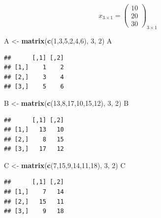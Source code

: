 \documentclass[
]{book}
\newenvironment{Shaded}{\begin{snugshade}}{\end{snugshade}}
\newcommand{\DecValTok}[1]{\textcolor[rgb]{0.00,0.00,0.81}{#1}}
\newcommand{\FunctionTok}[1]{\textcolor[rgb]{0.13,0.29,0.53}{\textbf{#1}}}
\newcommand{\NormalTok}[1]{#1}
\newcommand{\OtherTok}[1]{\textcolor[rgb]{0.56,0.35,0.01}{#1}}
\begin{document}
\[x_{3×1} =
\begin{pmatrix}
 10 \\
 20 \\
 30
\end{pmatrix}_{3×1}\]

\begin{Shaded}
\begin{Highlighting}[]
\NormalTok{ A }\OtherTok{\textless{}{-}} \FunctionTok{matrix}\NormalTok{(}\FunctionTok{c}\NormalTok{(}\DecValTok{1}\NormalTok{,}\DecValTok{3}\NormalTok{,}\DecValTok{5}\NormalTok{,}\DecValTok{2}\NormalTok{,}\DecValTok{4}\NormalTok{,}\DecValTok{6}\NormalTok{), }\DecValTok{3}\NormalTok{, }\DecValTok{2}\NormalTok{) }
\NormalTok{ A }
\end{Highlighting}
\end{Shaded}

\begin{verbatim}
##      [,1] [,2]
## [1,]    1    2
## [2,]    3    4
## [3,]    5    6
\end{verbatim}

\begin{Shaded}
\begin{Highlighting}[]
\NormalTok{ B }\OtherTok{\textless{}{-}} \FunctionTok{matrix}\NormalTok{(}\FunctionTok{c}\NormalTok{(}\DecValTok{13}\NormalTok{,}\DecValTok{8}\NormalTok{,}\DecValTok{17}\NormalTok{,}\DecValTok{10}\NormalTok{,}\DecValTok{15}\NormalTok{,}\DecValTok{12}\NormalTok{), }\DecValTok{3}\NormalTok{, }\DecValTok{2}\NormalTok{) }
\NormalTok{ B }
\end{Highlighting}
\end{Shaded}

\begin{verbatim}
##      [,1] [,2]
## [1,]   13   10
## [2,]    8   15
## [3,]   17   12
\end{verbatim}

\begin{Shaded}
\begin{Highlighting}[]
\NormalTok{ C }\OtherTok{\textless{}{-}} \FunctionTok{matrix}\NormalTok{(}\FunctionTok{c}\NormalTok{(}\DecValTok{7}\NormalTok{,}\DecValTok{15}\NormalTok{,}\DecValTok{9}\NormalTok{,}\DecValTok{14}\NormalTok{,}\DecValTok{11}\NormalTok{,}\DecValTok{18}\NormalTok{), }\DecValTok{3}\NormalTok{, }\DecValTok{2}\NormalTok{) }
\NormalTok{ C }
\end{Highlighting}
\end{Shaded}

\begin{verbatim}
##      [,1] [,2]
## [1,]    7   14
## [2,]   15   11
## [3,]    9   18
\end{verbatim}
\end{document}
